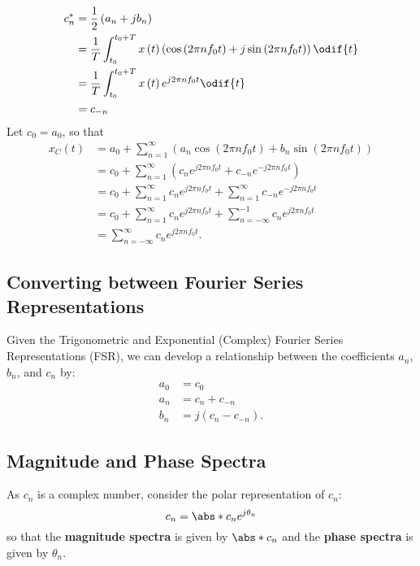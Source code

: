 \documentclass{article}
\begin{document}
\begin{align*}
    c_n^\ast & = \frac{1}{2} \left( a_n + j b_n \right)                                                                                                             \\
             & = \frac{1}{T} \int_{t_0}^{t_0 + T} x\left( t \right) \left( \cos{\left( 2\pi n f_0 t \right)} + j \sin{\left( 2\pi n f_0 t \right)} \right) \odif{t} \\
             & = \frac{1}{T} \int_{t_0}^{t_0 + T} x\left( t \right) e^{j 2\pi n f_0 t} \odif{t}                                                                     \\
             & = c_{-n}
\end{align*}
Let \(c_0 = a_0\), so that
\begin{align*}
    x_C\left( t \right) & = a_0 + \sum_{n = 1}^\infty \left( a_n \cos{\left( 2\pi n f_0 t \right)} + b_n \sin{\left( 2\pi n f_0 t \right)} \right) \\
                        & = c_0 + \sum_{n = 1}^\infty \left( c_n e^{j 2\pi n f_0 t} + c_{-n} e^{-j 2\pi n f_0 t} \right)                           \\
                        & = c_0 + \sum_{n = 1}^\infty c_n e^{j 2\pi n f_0 t} + \sum_{n = 1}^\infty c_{-n} e^{-j 2\pi n f_0 t}                      \\
                        & = c_0 + \sum_{n = 1}^\infty c_n e^{j 2\pi n f_0 t} + \sum_{n = -\infty}^{-1} c_{n} e^{j 2\pi n f_0 t}                    \\
                        & = \sum_{n = -\infty}^\infty c_n e^{j 2\pi n f_0 t}.
\end{align*}
\subsection{Converting between Fourier Series Representations}
Given the Trigonometric and Exponential (Complex) Fourier Series Representations (FSR),
we can develop a relationship between the coefficients \(a_n\), \(b_n\), and \(c_n\) by:
\begin{align*}
    a_0 & = c_0                            \\
    a_n & = c_n + c_{-n}                   \\
    b_n & = j \left( c_n - c_{-n} \right).
\end{align*}
\subsection{Magnitude and Phase Spectra}
As \(c_n\) is a complex number, consider the polar representation of \(c_n\):
\begin{equation*}
    c_n = \abs*{c_n} e^{j \theta_n}
\end{equation*}
so that the \textbf{magnitude spectra} is given by \(\abs*{c_n}\) and the \textbf{phase spectra} is given by \(\theta_n\).
\end{document}
